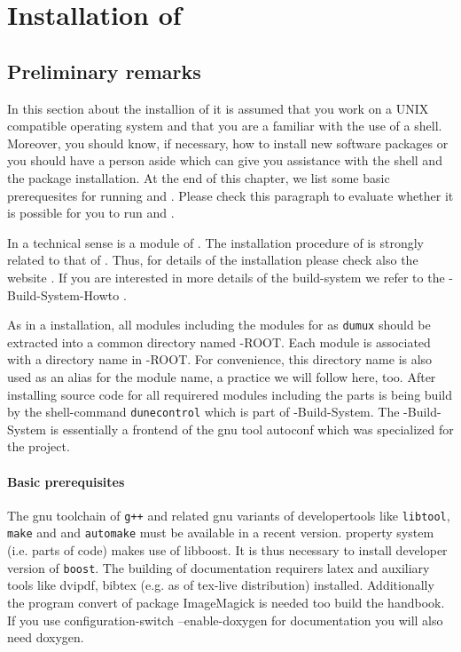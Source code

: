 \section{Installation of \Dumux} \label{install}
\subsection{Preliminary remarks}

In this section about the installion of \Dumux it is assumed that you work on a UNIX compatible operating system and that you are a familiar with the use of a shell. Moreover, you should know,  if necessary, how to install
new software packages or you should have a person aside which can give you assistance with the shell and
the package installation. At the end of this chapter, we list some basic prerequesites for running \Dune and \Dumux. Please check this paragraph to evaluate whether it is possible for you to run \Dune and \Dumux.

In a technical sense \Dumux is a module of \Dune. The installation procedure of \Dumux is strongly related to 
that of \Dune.  Thus, for details of the installation please check also the {\Dune} website \cite{DUNE-HP}. If you are interested in more details of the build-system we refer to the {\Dune}-Build-System-Howto \cite{DUNE-HP}.

As in a \Dune installation, all \Dune modules including the modules for \Dumux as \texttt{dumux} should be extracted into a common directory named {\Dune}-ROOT. Each \Dune module is associated with a directory name in {\Dune}-ROOT. For convenience, this directory name is  also used as an alias for the module name, a practice we will follow here, too.
After installing source code for all requirered \Dune modules including the \Dumux parts
\Dune is being build by the shell-command \texttt{dunecontrol} which is part of {\Dune}-Build-System. The {\Dune}-Build-System is essentially a frontend of the gnu tool autoconf which was specialized for the \Dune project.

\paragraph{Basic prerequisites} \label{prerequisites}
The gnu toolchain of \texttt{g++}  and related gnu variants of developertools like \texttt{libtool}, \texttt{make} and
and \texttt{automake} must be available in a recent version. \Dumux property system (i.e. parts of code) makes use of libboost. It is thus necessary
to install developer version of \texttt{boost}.
The building of documentation requirers latex and auxiliary tools like dvipdf, bibtex (e.g. as of tex-live distribution) installed. Additionally the program convert of package ImageMagick is needed too build the handbook.  If you use configuration-switch --enable-doxygen for documentation you will also need doxygen.

